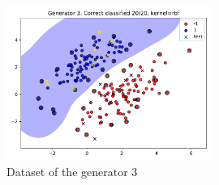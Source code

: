 \documentclass[12pt,a4paper]{article}
\begin{document}
\begin{figure}[h]
	\centering
	\includegraphics[width=0.6\textwidth]{ex1/3.pdf}
	\caption{Dataset of the generator 3}
	\label{fig:ex1gen3}
\end{figure}
%
\end{document}
